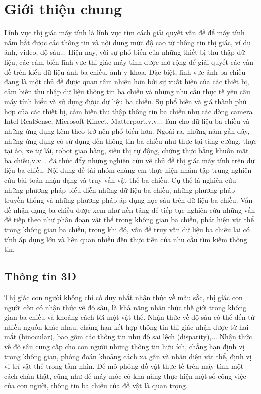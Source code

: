 \section{Giới thiệu chung}
Lĩnh vực thị giác máy tính là lĩnh vực tìm cách giải quyết vấn đề để máy tính nắm bắt được các thông tin và nội dung mức độ cao từ thông tin thị giác, ví dụ ảnh, video, độ sâu... Hiện nay, với sự phổ biến của những thiết bị thu thập dữ liệu, các cảm biến lĩnh vực thị giác máy tính được mở rộng để giải quyết các vấn đề trên kiểu dữ liệu ảnh ba chiều, ảnh y khoa. Đặc biệt, lĩnh vực ảnh ba chiều đang là một chủ đề được quan tâm nhiều hơn bởi sự xuất hiện của các thiết bị, cảm biến thu thập dữ liệu thông tin ba chiều và những nhu cầu thực tế yêu cầu máy tính hiểu và sử dụng được dữ liệu ba chiều. Sự phổ biến và giá thành phù hợp của các thiết bị, cảm biến thu thập thông tin ba chiều như các dòng camera Intel RealSense\cite{IntelRealSense}, Microsoft Kinect\cite{Kinect}, Matterport\cite{Matterport},v.v... làm cho dữ liệu ba chiều và những ứng dụng kèm theo trở nên phổ biến hơn. Ngoài ra, những năm gần đây, những ứng dụng có sử dụng đến thông tin ba chiều như thực tại tăng cường, thực tại ảo, xe tự lái, robot giao hàng, siêu thị tự động, chứng thực bằng khuôn mặt ba chiều,v.v... đã thúc đẩy những nghiên cứu về chủ đề thị giác máy tính trên dữ liệu ba chiều. Nội dung đề tài nhóm chúng em thực hiện nhằm tập trung nghiên cứu bài toán nhận dạng và truy vấn vật thể ba chiều. Cụ thể là nghiên cứu những phương pháp biểu diễn những dữ liệu ba chiều, những phương pháp truyền thống và những phương pháp áp dụng học sâu trên dữ liệu ba chiều. Vấn đề nhận dạng ba chiều được xem như nền tảng để tiếp tục nghiên cứu những vấn đề tiếp theo như phân đoạn vật thể trong không gian ba chiều, phát hiện vật thể trong không gian ba chiều, trong khi đó, vấn đề truy vấn dữ liệu ba chiều lại có tính áp dụng lớn và liên quan nhiều đến thực tiễn của nhu cầu tìm kiếm thông tin.


\subsection{Thông tin 3D}
Thị giác con người không chỉ có duy nhất nhận thức về màu sắc, thị giác con người còn có nhận thức về độ sâu, là khả năng nhận thức thế giới trong không gian ba chiều và khoảng cách tới một vật thể. Nhận thức về độ sâu có thể đến từ nhiều nguồn khác nhau, chẳng hạn kết hợp thông tin thị giác nhận được từ hai mắt (binocular), bao gồm các thông tin như độ sai lệch (disparity),... Nhận thức về độ sâu cung cấp cho con người những thông tin hữu ích, chẳng hạn định vị trong không gian, phỏng đoán khoảng cách xa gần và nhận diện vật thể, định vị vị trí vật thể trong tầm nhìn. Để mô phỏng đồ vật thực tế trên máy tính một cách chân thật, cũng như để máy móc có khả năng thực hiện một số công việc của con người, thông tin ba chiều của đồ vật là quan trọng. 

